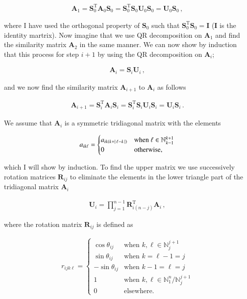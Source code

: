 \documentclass[11pt,english,a4paper]{article}
\begin{document}
\begin{flushleft}
\begin{align*}
\textbf{A}_1 = \textbf{S}_0^{\text{T}} \textbf{A}_0 \textbf{S}_0 
=\textbf{S}_0^{\text{T}} \textbf{S}_0\textbf{U}_0 \textbf{S}_0 = \textbf{U}_0 \textbf{S}_0 \,,
\end{align*}

where I have used the orthogonal property of $\textbf{S}_0$ such that $\textbf{S}_0^{\text{T}} \textbf{S}_0 = \textbf{I}$ ($\textbf{I}$ is the identity martrix). Now imagine that we use QR decomposition on $\textbf{A}_1$ and find the similarity matrix $\textbf{A}_2$ in the same manner. We can now show by induction that this process for step $i+1$ by using the QR decomposition on $\textbf{A}_i$;

\begin{align}
\textbf{A}_i = \textbf{S}_i \textbf{U}_i \,,
\label{eq_20}
\end{align}

and we now find the similarity matrix $\textbf{A}_{i+1}$ to $\textbf{A}_i$ as follows

\begin{align}
\textbf{A}_{i+1} = \textbf{S}_i^{\text{T}} \textbf{A}_i \textbf{S}_i 
=\textbf{S}_i^{\text{T}} \textbf{S}_i\textbf{U}_i \textbf{S}_i = \textbf{U}_i \textbf{S}_i \,.
\label{eq_21}
\end{align}

We assume that $\textbf{A}_i$ is a symmetric tridiagonal matrix with the elements 

\begin{align*}
a_{ik\ell} = \begin{cases} a_{ik(k+\left\vert{\,\ell-k\,}\right\vert)} & \text{when } \ell \in \mathbb{N}_{k-1}^{k+1} \\ 0 & \text{otherwise,}\end{cases}
\end{align*}

which I will show by induction. To find the upper matrix we use successively rotation matrices $\textbf{R}_{ij}$ to eliminate the elements in the lower triangle part of the tridiagonal matrix $\textbf{A}_i$ 

\begin{align}
\textbf{U}_i = \prod_{j=1}^{n-1} \textbf{R}_{i(n-j)}^{\text{T}} \textbf{A}_i \,,
\label{eq_22}
\end{align}

where the rotation matrix $\textbf{R}_{ij}$ is defined as

\begin{align*}
r_{ijk\ell} = \begin{cases} \cos\theta_{ij} & \text{when } k,\ell \in\mathbb{N}_j^{j+1} \\ \sin\theta_{ij} & \text{when } k=\ell-1= j \\ -\sin\theta_{ij} & \text{when } k-1=\ell= j \\ 1 & \text{when } k,\ell\in\mathbb{N}_1^n/\mathbb{N}_j^{j+1} \\ 0 & \text{elsewhere.} \end{cases}  
\end{align*}


\end{flushleft}
\end{document}
